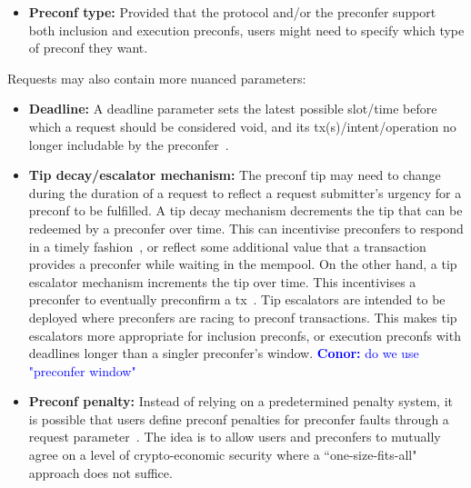\documentclass[a4paper]{article}
\theoremstyle{boldstyle}
\newcommand{\cm}[1]{\textcolor{blue}{\textbf{Conor:} #1}}
\newcommand{\qb}[1]{\textcolor{red}{\textbf{Quentin:} #1}}
\begin{document}
\begin{itemize}
        \item \textbf{Preconf type:} 
        Provided that the protocol and/or the preconfer support both inclusion and execution preconfs, users might need to specify which type of preconf they want.
    \end{itemize}

    Requests may also contain more nuanced parameters:
    \begin{itemize}
        \item \textbf{Deadline:} A deadline parameter sets the latest possible slot/time before which a request should be considered void, and its tx(s)/intent/operation no longer includable by the preconfer~\cite{W:PreconfirmationsforVanillaBasedRollups}. 
        
        \item \textbf{Tip decay/escalator mechanism:} 
        The preconf tip may need to change during the duration of a request to reflect a request submitter's urgency for a preconf to be fulfilled. A tip decay mechanism decrements the tip that can be redeemed by a preconfer over time. This can incentivise preconfers to respond in a timely fashion~\cite{W:Documentation-BidDecayMechanism}, or reflect some additional value that a transaction provides a preconfer while waiting in the mempool. On the other hand, a tip escalator mechanism increments the tip over time. This incentivises a preconfer to eventually preconfirm a tx~\cite{W:OrderflowauctionsandcentralisationII:orderflowauctions}. Tip escalators are intended to be deployed where preconfers are racing to preconf transactions. This makes tip escalators more appropriate for inclusion preconfs, or execution preconfs with deadlines longer than a singler preconfer's window. \cm{do we use "preconfer window"}
        
        \item \textbf{Preconf penalty:} Instead of relying on a predetermined penalty system, it is possible that users define preconf penalties for preconfer faults through a request parameter~\cite{W:User-DefinedPenalties:EnsuringHonestPreconfBehavior, W:Documentation-BidStructure}. The idea is to allow users and preconfers to mutually agree on a level of crypto-economic security where a ``one-size-fits-all" approach does not suffice.
        

\end{itemize}
\end{document}
